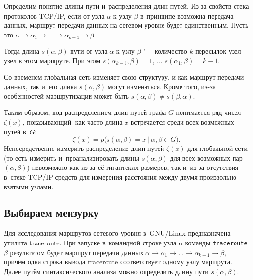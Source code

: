 \documentclass[10pt, a5paper]{article}
\begin{document}
Определим понятие длины пути и~распределения длин путей.
Из-за 
свойств
стека протоколов TCP/IP, если от узла $\alpha$ к узлу $\beta$ в~принципе возможна передача данных,  маршрут передачи данных на сетевом уровне будет единственным.
Пусть это $\alpha \to \alpha_1 \to \ldots \to \alpha_{k-1} \to \beta$. 


Тогда длина  $s(\alpha, \beta)$ пути от узла $\alpha$ к узлу $\beta$ "--- количество $k$ пересылок узел-узел в этом маршруте.
При этом $s(\alpha_{k-1}, \beta) = 1$, ...  $s(\alpha_1, \beta) = k-1$.

Со временем глобальная сеть изменяет свою структуру, и как маршрут передачи данных, так и~его длина $s(\alpha, \beta)$ могут изменяться.
Кроме того,
из-за особенностей маршрутизации может быть $s(\alpha, \beta) \neq s(\beta, \alpha)$.

Таким образом, под распределением длин путей графа $G$ 
понимается ряд чисел $\zeta(x)$, показывающий, как часто длина $x$ встречается среди всех возможных путей в~$G$:
$$
\zeta(x) = p \big(
s(\alpha,\beta)=x ~ | ~ \alpha,\beta \in G
\big).
$$
Непосредственно измерить распределение длин путей $\zeta(x)$ для глобальной сети (то есть измерить и~проанализировать длины $s(\alpha, \beta)$ для всех возможных пар $(\alpha, \beta)$) невозможно как из-за её гигантских размеров, так и~из-за отсутствия в~стеке TCP/IP средств для измерения расстояния между двумя произвольно взятыми узлами.


\subsection*{Выбираем мензурку}

Для исследования маршрутов сетевого уровня в~GNU/Linux \linebreak предназначена утилита traceroute.
При запуске в~командной строке узла $\alpha$ команды \mbox{\texttt{traceroute $\beta$}} результатом будет маршрут передачи данных $\alpha \to \alpha_1 \to \ldots \to \alpha_{k-1} \to \beta$, причём одна строка вывода traceroute соответствует одному узлу маршрута.
Далее путём синтаксического анализа можно определить длину пути $s(\alpha, \beta)$.
\end{document}
